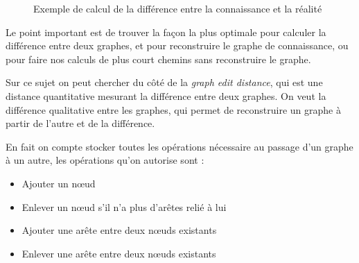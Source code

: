 \documentclass[a4paper]{article}
\begin{document}
\begin{figure}
  \noindent{}
  \centering
  \caption{Exemple de calcul de la différence entre la connaissance et la
  réalité}
  \label{fig:difference}
\end{figure}

Le point important est de trouver la façon la plus optimale pour calculer la
différence entre deux graphes, et pour reconstruire le graphe de connaissance,
ou pour faire nos calculs de plus court chemins sans reconstruire le graphe.

Sur ce sujet on peut chercher du côté de la \emph{graph edit distance}, qui est
une distance quantitative mesurant la différence entre deux graphes. On veut la
différence qualitative entre les graphes, qui permet de reconstruire un graphe à
partir de l'autre et de la différence.

En fait on compte stocker toutes les opérations nécessaire au passage d'un
graphe à un autre, les opérations qu'on autorise sont :

\begin{itemize}
  \item Ajouter un nœud
  \item Enlever un nœud s'il n'a plus d'arêtes relié à lui
  \item Ajouter une arête entre deux nœuds existants
  \item Enlever une arête entre deux nœuds existants
\end{itemize}
\end{document}

